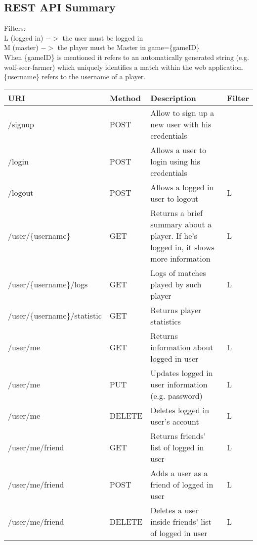 \subsection{REST API Summary}

Filters: \\
L (logged in) $->$ the user must be logged in\\
M (master) $->$ the player must be Master in game=\{gameID\} \\
When \{gameID\} is mentioned it refers to an automatically generated string (e.g. wolf-seer-farmer) which uniquely identifies a match within the web application.
\{username\} refers to the username of a player.
\begin{longtable}{|p{}|p{} |p{}|p{}|} 
\hline
\textbf{URI} & \textbf{Method} & \textbf{Description} & \textbf{Filter} \\\hline
/signup & POST & Allow to sign up a new user with his credentials & \\\hline
/login & POST & Allows a user to login using his credentials & \\\hline
/logout & POST & Allows a logged in user to logout & L \\\hline
/user/\{username\} & GET & Returns a brief summary about a player. If he's logged in, it shows more information & L \\\hline
/user/\{username\}/logs & GET & Logs of matches played by such player & L \\\hline
/user/\{username\}/statistic & GET & Returns player statistics & \\\hline

/user/me & GET & Returns information about logged in user & L \\\hline
/user/me & PUT & Updates logged in user information (e.g. password) & L \\\hline
/user/me & DELETE & Deletes logged in user's account & L \\\hline
/user/me/friend & GET & Returns friends' list of logged in user & L \\\hline
/user/me/friend & POST & Adds a user as a friend of logged in user & L \\\hline
/user/me/friend & DELETE & Deletes a user inside friends' list of logged in user & L \\\hline


\end{longtable}
